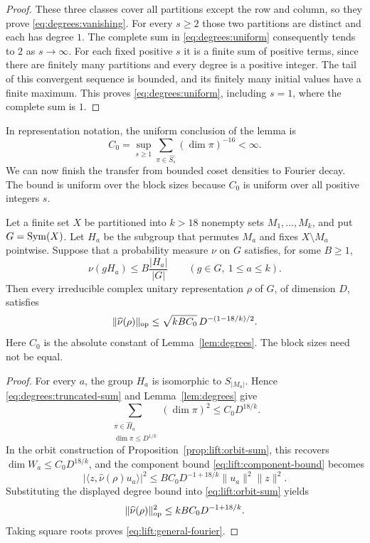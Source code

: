\begin{proof}
These three classes cover all partitions except the row and column,
so they prove \eqref{eq:degrees:vanishing}. For every $s\ge2$ those
two partitions are distinct and each has degree $1$. The complete
sum in \eqref{eq:degrees:uniform} consequently tends to $2$ as
$s\to\infty$. For each fixed positive $s$ it is a finite sum of
positive terms, since there are finitely many partitions and every
degree is a positive integer. The tail of this convergent sequence
is bounded, and its finitely many initial values have a finite
maximum. This proves \eqref{eq:degrees:uniform}, including $s=1$,
where the complete sum is $1$.
\end{proof}

In representation notation, the uniform conclusion of the lemma is
\begin{equation}
\label{eq:lift:degree-constant}
 C_0=\sup_{s\ge1}\sum_{\pi\in\widehat{S_s}}(\dim\pi)^{-16}<\infty.
\end{equation}
We can now finish the transfer from bounded coset densities to Fourier
decay. The bound is uniform over the block sizes because $C_0$ is uniform
over all positive integers $s$.

\begin{corollary}
\label{prop:lift}
Let a finite set $X$ be partitioned into $k>18$ nonempty sets
$M_1,\ldots,M_k$, and put $G=\operatorname{Sym}(X)$. Let $H_a$ be the subgroup that
permutes $M_a$ and fixes $X\setminus M_a$ pointwise. Suppose that a
probability measure $\nu$ on $G$ satisfies, for some $B\ge1$,
\[
 \nu(gH_a)\le B\frac{|H_a|}{|G|}
 \qquad(g\in G,\ 1\le a\le k).
\]
Then every irreducible complex unitary representation $\rho$ of $G$, of
dimension $D$, satisfies
\begin{equation}
\label{eq:lift:general-fourier}
 \|\widehat\nu(\rho)\|_{\mathrm{op}}
 \le\sqrt{kBC_0}\,D^{-(1-18/k)/2}.
\end{equation}
Here $C_0$ is the absolute constant of Lemma~\ref{lem:degrees}. The block
sizes need not be equal.
\end{corollary}

\begin{proof}
For every $a$, the group $H_a$ is isomorphic to $S_{|M_a|}$. Hence
\eqref{eq:degrees:truncated-sum} and Lemma~\ref{lem:degrees} give
\[
 \sum_{\substack{\pi\in\widehat H_a\\\dim\pi\le D^{1/k}}}(\dim\pi)^2
 \le C_0D^{18/k}.
\]
In the orbit construction of Proposition~\ref{prop:lift:orbit-sum}, this
recovers $\dim W_a\le C_0D^{18/k}$, and the component bound
\eqref{eq:lift:component-bound} becomes
\[
 |\langle z,\widehat\nu(\rho)u_a\rangle|^2
 \le BC_0D^{-1+18/k}\|u_a\|^2\|z\|^2.
\]
Substituting the displayed degree bound into
\eqref{eq:lift:orbit-sum} yields
\[
 \|\widehat\nu(\rho)\|_{\mathrm{op}}^2
 \le kBC_0D^{-1+18/k}.
\]
Taking square roots proves \eqref{eq:lift:general-fourier}.
\end{proof}
